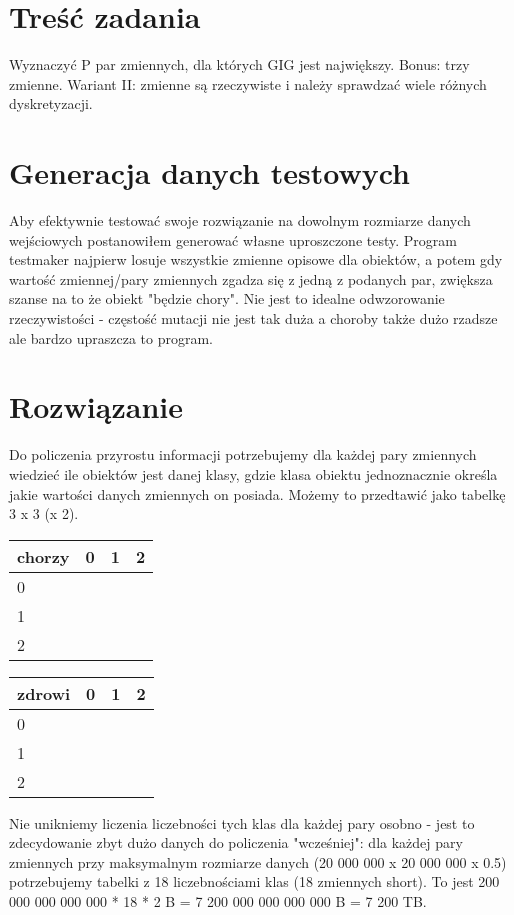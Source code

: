 \documentclass[a4paper]{article}
\begin{document}
    \section{Treść zadania}
    Wyznaczyć P par zmiennych, dla których GIG jest największy. Bonus: trzy zmienne. Wariant II: zmienne są rzeczywiste i należy sprawdzać wiele różnych dyskretyzacji.
    \section{Generacja danych testowych}
    Aby efektywnie testować swoje rozwiązanie na dowolnym rozmiarze danych wejściowych postanowiłem generować własne uproszczone testy. Program testmaker najpierw losuje wszystkie zmienne opisowe dla obiektów, a potem gdy wartość zmiennej/pary zmiennych zgadza się z jedną z podanych par, zwiększa szanse na to że obiekt "będzie chory". Nie jest to idealne odwzorowanie rzeczywistości - częstość mutacji nie jest tak duża a choroby także dużo rzadsze ale bardzo upraszcza to program.
    \section{Rozwiązanie}
    Do policzenia przyrostu informacji potrzebujemy dla każdej pary zmiennych wiedzieć ile obiektów jest danej klasy, gdzie klasa obiektu jednoznacznie określa jakie wartości danych zmiennych on posiada. Możemy to przedtawić jako tabelkę 3 x 3 (x 2).

    \begin{tabular}{|l|r|r|r|}
        \hline
        chorzy & 0 & 1 & 2 \\
        \hline
        0 & & & \\
        \hline
        1 & & & \\
        \hline
        2 & & & \\
        \hline
    \end{tabular}
    \begin{tabular}{|l|r|r|r|}
        \hline
        zdrowi & 0 & 1 & 2 \\
        \hline
        0 & & & \\
        \hline
        1 & & & \\
        \hline
        2 & & & \\
        \hline
    \end{tabular}

    Nie unikniemy liczenia liczebności tych klas dla każdej pary osobno - jest to zdecydowanie zbyt dużo danych do policzenia "wcześniej": dla każdej pary zmiennych przy maksymalnym rozmiarze danych (20 000 000 x 20 000 000 x 0.5) potrzebujemy tabelki z 18 liczebnościami klas (18 zmiennych short). To jest 200 000 000 000 000 * 18 * 2 B = 7 200 000 000 000 000 B = 7 200 TB.
\end{document}
